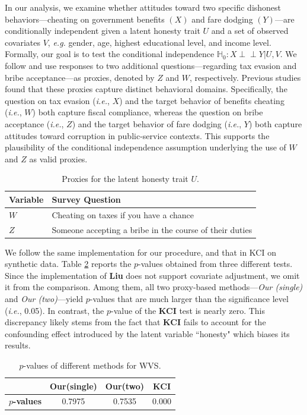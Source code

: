 \documentclass[
  12pt]{article}
\newcommand{\ind}{\perp\!\!\!\!\perp}
\def\mH{\mathbb{H}}
\begin{document}
In our analysis, we examine whether attitudes toward two specific dishonest behaviors—cheating on government benefits $(X)$ and fare dodging $(Y)$—are conditionally independent given a latent honesty trait $U$ and a set of observed covariates $V$, \emph{e.g.} gender, age, highest educational level, and income level. Formally, our goal is to test the conditional independence $\mH_0:X\ind Y|U,V$. We follow \citet{ying2025generalized} and use responses to two additional questions—regarding tax evasion and bribe acceptance—as proxies, denoted by $Z$ and $W$, respectively. Previous studies \citep{halla2008taxes,chabova2017measuring} found that these proxies capture distinct behavioral domains. Specifically, the question on tax evasion (\emph{i.e.}, $X$) and the target behavior of benefits cheating (\emph{i.e.}, $W$) both capture fiscal compliance, whereas the question on bribe acceptance (\emph{i.e.}, $Z$) and the target behavior of fare dodging (\emph{i.e.}, $Y$) both capture attitudes toward corruption in public-service contexts. This supports the plausibility of the conditional independence assumption underlying the use
of $W$ and $Z$ as valid proxies.
\begin{table}[htbp]
\centering
\caption{Proxies for the latent honesty trait $U$.}
\begin{tabular}{ll}
\toprule
\textbf{Variable} & \textbf{Survey Question} \\
\midrule
$W$ & Cheating on taxes if you have a chance \\
$Z$ & Someone accepting a bribe in the course of their duties \\
\bottomrule
\end{tabular}
\label{tab:proxies}
\end{table}


We follow the same implementation for our procedure, and that in KCI on synthetic data. Table \ref{tab:pvalues_wvs} reports the $p$-values obtained from three different tests. Since the implementation of \textbf{Liu} does not support covariate adjustment, we omit it from the comparison. Among them, all two proxy-based methods—\emph{Our (single)} and \emph{Our (two)}—yield $p$-values that are much larger than the significance level (\emph{i.e.}, 0.05). In contrast, the $p$-value of the \textbf{KCI} test is nearly zero. This discrepancy likely stems from the fact that \textbf{KCI} fails to account for the confounding effect introduced by the latent variable ``honesty" which biases its results. 
\begin{table}[ht]
\centering
\caption{$p$-values of different methods for WVS.}
\begin{tabular}{lccc}
\toprule
 & Our(single) & Our(two)  & KCI \\
\midrule
\textbf{$p$-values} & 0.7975 &  0.7535  & 0.000\\
\bottomrule
\end{tabular}
\label{tab:pvalues_wvs}
\end{table}
\end{document}
